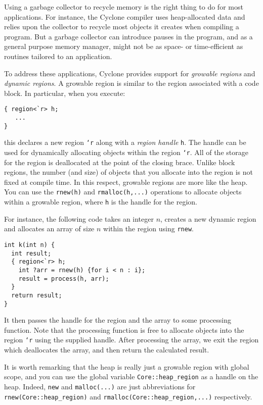 Using a garbage collector to recycle memory is the right thing to do
for most applications.  For instance, the Cyclone compiler uses
heap-allocated data and relies upon the collector to recycle most
objects it creates when compiling a program.  But a garbage collector
can introduce pauses in the program, and as a general purpose memory
manager, might not be as space- or time-efficient as routines tailored
to an application.

To address these applications, Cyclone provides support for \emph{growable
regions} and \emph{dynamic regions}.  A growable region is similar to the 
region associated with
a code block.  In particular, when you execute:
\begin{verbatim}
{ region<`r> h;
   ...
}
\end{verbatim}
this declares a new region \texttt{`r} along with a \emph{region handle}
\texttt{h}.  The handle can be used for dynamically allocating objects within
the region \texttt{`r}.  All of the storage for
the region is deallocated at the point of the closing brace.  
Unlike block
regions, the number (and size) of objects that you allocate into
the region is not fixed at compile time.  In this respect, growable
regions are more like the heap.  You can use the \texttt{rnew(h)} and
\texttt{rmalloc(h,...)} operations to allocate objects within a growable
region, where \texttt{h} is the handle for the region.
 
For instance, the following code takes an integer $n$, creates
a new dynamic region and allocates an array of size
$n$ within the region using \texttt{rnew}.  
\begin{verbatim}
int k(int n) {
  int result;
  { region<`r> h;
    int ?arr = rnew(h) {for i < n : i};
    result = process(h, arr);
  }
  return result;
}
\end{verbatim}
It then passes the
handle for the region and the array to some processing function.
Note that the processing function is free to allocate objects
into the region \texttt{`r} using the supplied handle.  
After processing the array, we exit the region which deallocates
the array, and then return the calculated result.

It is worth remarking that the heap is really just a growable region
with global scope, and you can use the global variable 
\texttt{Core::heap_region}
as a handle on the heap.  Indeed, \texttt{new} and \texttt{malloc(...)}
are just abbreviations for \texttt{rnew(Core::heap_region)} and
\texttt{rmalloc(Core::heap_region,...)} respectively.  

